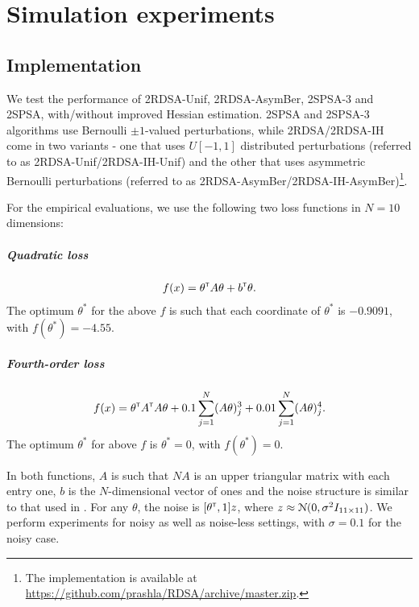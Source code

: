 \chapter{Simulation experiments}
\label{sec:expts}
\section{Implementation}
We test the performance of 2RDSA-Unif, 2RDSA-AsymBer, 2SPSA-3 and 2SPSA, with/without improved Hessian estimation. 
2SPSA and 2SPSA-3 algorithms use Bernoulli $\pm 1$-valued perturbations, while 2RDSA/2RDSA-IH come in two variants - one that uses $U[-1,1]$ distributed perturbations (referred to as 2RDSA-Unif/2RDSA-IH-Unif) and the other that uses asymmetric Bernoulli perturbations (referred to as 2RDSA-AsymBer/2RDSA-IH-AsymBer)\footnote{The implementation is available at \url{https://github.com/prashla/RDSA/archive/master.zip}.}.

For the empirical evaluations, we use the following two loss functions in $N=10$ dimensions:
\paragraph{Quadratic loss}
\begin{align}
f(x) = \theta^\mathsf{\scriptscriptstyle T} A \theta+ b^\mathsf{\scriptscriptstyle T} \theta.\label{eq:quadratic}
\end{align} 
The optimum $\theta^*$ for the above $f$ is such that each coordinate of $\theta^*$ is $-0.9091$, with $f(\theta^*) = -4.55$.

\paragraph{Fourth-order loss}
\begin{align} 
f(x) = \theta^\mathsf{\scriptscriptstyle T} A^\mathsf{\scriptscriptstyle T} A \theta + 0.1 \sum_{j=1}^N (A\theta)^3_j + 0.01 \sum_{j=1}^N (A\theta)^4_j.\label{eq:4thorder}
 \end{align} 
The optimum $\theta^*$ for above $f$ is $\theta^*=0$, with $f(\theta^*) = 0$. 

In both functions, $A$ is such that $NA$ is an upper triangular matrix with each entry one, $b$ is the $N$-dimensional vector of ones and the noise structure is similar to that used in \cite{spall_adaptive}. For any $\theta$, the noise is $[\theta^\mathsf{\scriptscriptstyle T}, 1]z$, where $z \approx \mathcal{N}(0,\sigma^2 I_{11\times11})$. We perform experiments for noisy as well as noise-less settings, with $\sigma=0.1$ for the noisy case. 



